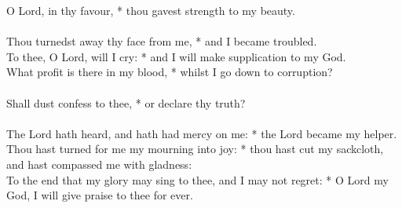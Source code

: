 \begin{Parallel}[v]{\colw}{\colx}
{{O Lord, in thy favour, * thou gavest strength to my beauty.\\ \\
Thou turnedst away thy face from me, * and I became troubled.\\
To thee, O Lord, will I cry: * and I will make supplication to my God.\\
What profit is there in my blood, * whilst I go down to corruption?\\ \\
Shall dust confess to thee, * or declare thy truth?\\ \\
The Lord hath heard, and hath had mercy on me: * the Lord became my helper.\\
Thou hast turned for me my mourning into joy: * thou hast cut my sackcloth, and hast compassed me with gladness:\\
To the end that my glory may sing to thee, and I may not regret: * O Lord my God, I will give praise to thee for ever.}}

\end{Parallel}


